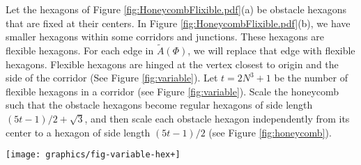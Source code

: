 Let the hexagons of Figure \ref{fig:HoneycombFlixible.pdf}(a) be obstacle hexagons that are fixed at their centers.
In Figure \ref{fig:HoneycombFlixible.pdf}(b), we have smaller hexagons within some corridors and junctions.
These hexagons are flexible hexagons.
For each edge in $\tilde{A}(\Phi)$, we will replace that edge with flexible hexagons.
Flexible hexagons are hinged at the vertex closest to origin and the side of the corridor (See Figure \ref{fig:variable}).
Let $t=2N^3+1$ be the number of flexible hexagons in a corridor (see Figure \ref{fig:variable}). 
Scale the honeycomb such that the obstacle hexagons become regular hexagons of side length $(5t-1)/2+\sqrt{3}$, and then scale each obstacle hexagon independently from its center to a hexagon of side length $(5t-1)/2$ (see Figure \ref{fig:honeycomb}). 

\begin{minipage}{\linewidth}
\begin{center}
\texttt{[image: graphics/fig-variable-hex+]}
\label{fig:variable}
\end{center}
\end{minipage}

